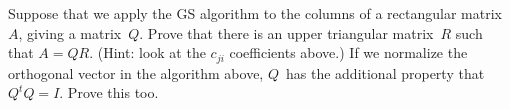   Suppose that we apply the \ac{GS} algorithm to the columns of a
  rectangular matrix~$A$, giving a matrix~$Q$. Prove that there is an
  upper triangular matrix~$R$ such that $A=QR$. (Hint: look at the
  $c_{ji}$ coefficients above.) If we normalize the
  orthogonal vector in the algorithm above, $Q$~has the additional property
  that $Q^tQ=I$. Prove this too.
